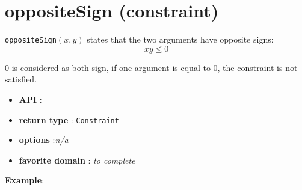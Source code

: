 \label{oppositesign}
\hypertarget{oppositesign}{}

\section{oppositeSign (constraint)}\label{oppositesign:oppositesignconstraint}\hypertarget{oppositesign:oppositesignconstraint}{}


\begin{notedef}
  \texttt{oppositeSign}$(x,y)$ states that the two arguments have opposite signs:
$$xy\le 0$$
\end{notedef}

\begin{notedef}
  0 is considered as both sign, if one argument is equal to 0, the constraint is not satisfied.
\end{notedef}


\begin{itemize}
	\item \textbf{API} : 
	\item \textbf{return type} : \texttt{Constraint}
	\item \textbf{options} :\emph{n/a}
	\item \textbf{favorite domain} : \emph{to complete}
\end{itemize}

\textbf{Example}:
 
